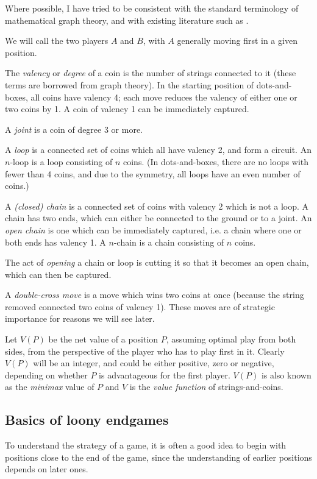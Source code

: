 \documentclass[a4paper,twocolumn]{article}
\begin{document}
Where possible, I have tried to be consistent with the standard
terminology of mathematical graph theory, and with existing literature
such as \cite{berl}.

We will call the two players $A$ and $B$, with $A$ generally moving
first in a given position.

The \emph{valency} or \emph{degree} of a coin is the number of strings
connected to it (these terms are borrowed from graph theory). In the
starting position of dots-and-boxes, all coins have valency 4; each
move reduces the valency of either one or two coins by 1. A coin of
valency 1 can be immediately captured.

A \emph{joint} is a coin of degree 3 or more.

A \emph{loop} is a connected set of coins which all have valency 2, and
form a circuit. An $n$-loop is a loop consisting of $n$ coins. (In
dots-and-boxes, there are no loops with fewer than 4 coins, and due to
the symmetry, all loops have an even number of coins.)

A \emph{(closed) chain} is a connected set of coins with valency 2
which is not a loop. A chain has two ends, which can either be
connected to the ground or to a joint. An \emph{open chain} is one
which can be immediately captured, i.e. a chain where one or both ends
has valency 1. A $n$-chain is a chain consisting of $n$ coins.

The act of \emph{opening} a chain or loop is cutting it so that it
becomes an open chain, which can then be captured.

A \emph{double-cross move} is a move which wins two coins at once
(because the string removed connected two coins of valency 1). These
moves are of strategic importance for reasons we will see later.

Let $V(P)$ be the net value of a position $P$, assuming optimal play
from both sides, from the perspective of the player who has to play
first in it. Clearly $V(P)$ will be an integer, and could be either
positive, zero or negative, depending on whether $P$ is advantageous
for the first player. $V(P)$ is also known as the \emph{minimax} value
of $P$ and $V$ is the \emph{value function} of strings-and-coins.

\subsection{Basics of loony endgames}

To understand the strategy of a game, it is often a good idea to begin
with positions close to the end of the game, since the understanding
of earlier positions depends on later ones.
\end{document}
